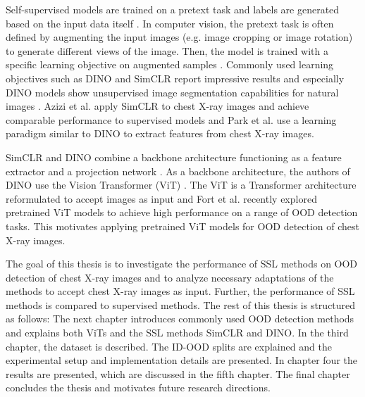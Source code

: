 Self-supervised models are trained on a pretext task and labels are generated based on the input data itself \citep{Jaiswal2021}.
In computer vision, the pretext task is often defined by augmenting the input images (e.g. image cropping or image rotation) to generate different views of the image.
Then, the model is trained with a specific learning objective on augmented samples \citep{Jaiswal2020}.
Commonly used learning objectives such as DINO \citep{Caron2021} and SimCLR \citep{Chen2020} report impressive results and especially DINO models show unsupervised image segmentation capabilities for natural images \citep{Caron2021}.
Azizi et al. \citep{Azizi2021} apply SimCLR to chest X-ray images and achieve comparable performance to supervised models and Park et al. \citep{Park2022} use a learning paradigm similar to DINO to extract features from chest X-ray images.
\par
SimCLR and DINO combine a backbone architecture functioning as a feature extractor and a projection network \citep{Caron2021,Chen2020}. 
As a backbone architecture, the authors of DINO use the Vision Transformer (ViT) \citep{Caron2021}.
The ViT is a Transformer architecture \citep{Vaswani2017} reformulated to accept images as input \citep{Dosovitskiy2020} and Fort et al. \citep{Fort2021} recently explored pretrained ViT models to achieve high performance on a range of OOD detection tasks.
This motivates applying pretrained ViT models for OOD detection of chest X-ray images.
\par
The goal of this thesis is to investigate the performance of SSL methods on OOD detection of chest X-ray images and to analyze necessary adaptations of the methods to accept chest X-ray images as input.
Further, the performance of SSL methods is compared to supervised methods.
The rest of this thesis is structured as follows: The next chapter introduces commonly used OOD detection methods and explains both ViTs and the SSL methods SimCLR and DINO.
In the third chapter, the dataset is described.
The ID-OOD splits are explained and the experimental setup and implementation details are presented.
In chapter four the results are presented, which are discussed in the fifth chapter.
The final chapter concludes the thesis and motivates future research directions.
